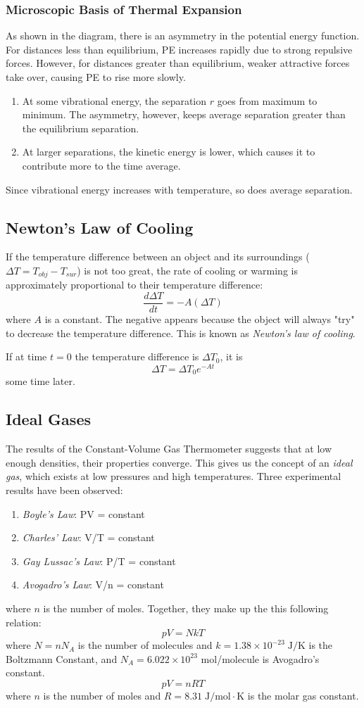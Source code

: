 \documentclass[../PhysicsFormulae.tex]{subfiles}
\begin{document}
\subsubsection{Microscopic Basis of Thermal Expansion}
As shown in the diagram, there is an asymmetry in the potential energy function. For distances less than equilibrium, PE increases rapidly due to strong repulsive forces. However, for distances greater than equilibrium, weaker attractive forces take over, causing PE to rise more slowly. 
\begin{enumerate}
\item At some vibrational energy, the separation $r$ goes from maximum to minimum. The asymmetry, however, keeps average separation greater than the equilibrium separation. 
\item At larger separations, the kinetic energy is lower, which causes it to contribute more to the time average.
\end{enumerate}
Since vibrational energy increases with temperature, so does average separation.
\subsection{Newton's Law of Cooling}
If the temperature difference between an object and its surroundings ($\Delta T = T_{obj} - T_{sur}$) is not too great, the rate of cooling or warming is approximately proportional to their temperature difference: 
\[ \frac{d\Delta T}{dt} = -A(\Delta T) \]
where $A$ is a constant. The negative appears because the object will always "try" to decrease the temperature difference. This is known as \textit{Newton's law of cooling}. \bigskip

If at time $t=0$ the temperature difference is $\Delta T_0$, it is 
\[ \Delta T = \Delta T_0 e^{-At} \]
some time later.
\subsection{Ideal Gases}
The results of the Constant-Volume Gas Thermometer suggests that at low enough densities, their properties converge. This gives us the concept of an \textit{ideal gas}, which exists at low pressures and high temperatures. Three experimental results have been observed: 
\begin{enumerate}
\item \textit{Boyle's Law}: PV = constant
\item \textit{Charles' Law}: V/T = constant
\item \textit{Gay Lussac's Law}: P/T = constant
\item \textit{Avogadro's Law}: V/n = constant
\end{enumerate}
where $n$ is the number of moles. Together, they make up the this following relation: 
\[ pV = NkT \]
where $N=nN_A$ is the number of molecules and $k = 1.38 \times 10^{-23} \; \textrm{J/K} $ is the Boltzmann Constant, and $N_A = 6.022 \times 10^{23}$ mol/molecule is Avogadro's constant. 
\[ pV = nRT \]
where $n$ is the number of moles and $R = 8.31 \; \textrm{J/mol} \cdot \textrm{K}$ is the molar gas constant. 
\end{document}
